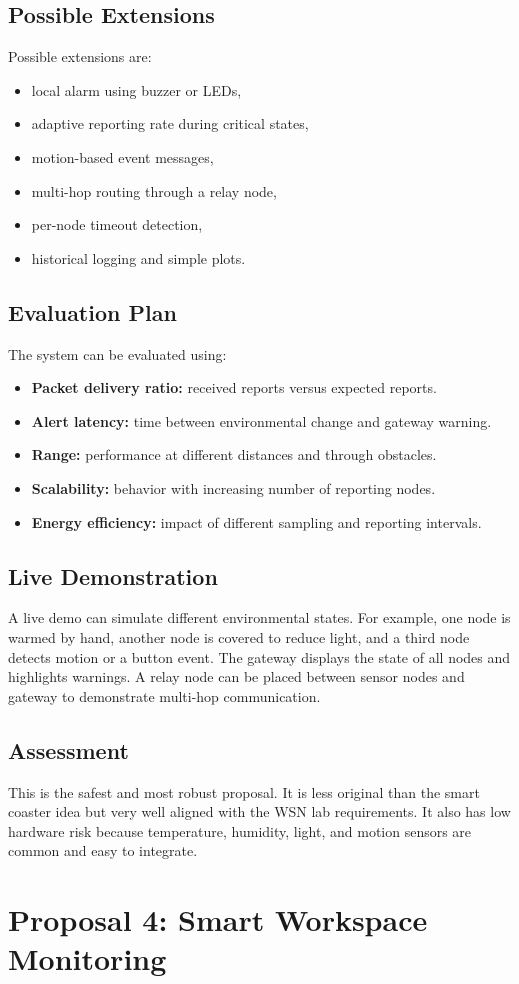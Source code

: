 \documentclass[11pt,a4paper]{article}
\newcommand{\projecttitle}[1]{\subsection*{#1}}
\begin{document}
\projecttitle{Possible Extensions}

Possible extensions are:

\begin{itemize}
    \item local alarm using buzzer or LEDs,
    \item adaptive reporting rate during critical states,
    \item motion-based event messages,
    \item multi-hop routing through a relay node,
    \item per-node timeout detection,
    \item historical logging and simple plots.
\end{itemize}

\projecttitle{Evaluation Plan}

The system can be evaluated using:

\begin{itemize}
    \item \textbf{Packet delivery ratio:} received reports versus expected reports.
    \item \textbf{Alert latency:} time between environmental change and gateway warning.
    \item \textbf{Range:} performance at different distances and through obstacles.
    \item \textbf{Scalability:} behavior with increasing number of reporting nodes.
    \item \textbf{Energy efficiency:} impact of different sampling and reporting intervals.
\end{itemize}

\projecttitle{Live Demonstration}

A live demo can simulate different environmental states. For example, one node is warmed by hand, another node is covered to reduce light, and a third node detects motion or a button event. The gateway displays the state of all nodes and highlights warnings. A relay node can be placed between sensor nodes and gateway to demonstrate multi-hop communication.

\projecttitle{Assessment}

This is the safest and most robust proposal. It is less original than the smart coaster idea but very well aligned with the WSN lab requirements. It also has low hardware risk because temperature, humidity, light, and motion sensors are common and easy to integrate.

\section{Proposal 4: Smart Workspace Monitoring}
\end{document}
